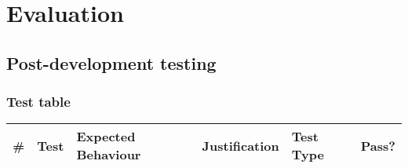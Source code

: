 \chapter{Evaluation}

\section{Post-development testing}

\subsection{Test table}

\begin{longtable}{|p{}|p{}|p{}|p{}|p{}|p{}|}
	\hline
	\textbf{\#} & \textbf{Test} & \textbf{Expected Behaviour} & \textbf{Justification} & \textbf{Test Type} & \textbf{Pass?} \\
	\hline
	\endhead
	

\end{longtable}
